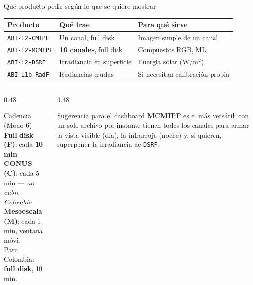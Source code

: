 \documentclass[10pt,aspectratio=169]{beamer}
\begin{document}
\begin{frame}{Qué producto pedir según lo que se quiere mostrar}
  \begin{table}
    \centering\footnotesize
    \begin{tabular}{@{}lll@{}}
      \toprule
      \textbf{Producto} & \textbf{Qué trae} & \textbf{Para qué sirve} \\
      \midrule
      \texttt{ABI-L2-CMIPF} & Un canal, full disk & Imagen simple de un canal \\
      \texttt{ABI-L2-MCMIPF} & \textbf{16 canales}, full disk & Compuestos RGB, ML \\
      \texttt{ABI-L2-DSRF} & Irradiancia en superficie & Energía solar (W/m$^2$) \\
      \texttt{ABI-L1b-RadF} & Radiancias crudas & Si necesitan calibración propia \\
      \bottomrule
    \end{tabular}
  \end{table}

  \vspace{0.3em}
  \begin{columns}[T]
    \begin{column}{0.48\textwidth}
      \begin{block}{Cadencia (Modo 6)}
        \small
        \textbf{Full disk (F)}: cada \textbf{10 min}\\
        \textbf{CONUS (C)}: cada 5 min --- \emph{no cubre Colombia}\\
        \textbf{Mesoescala (M)}: cada 1 min, ventana móvil\\[0.3em]
        Para Colombia: \textbf{full disk}, 10 min.
      \end{block}
    \end{column}
    \begin{column}{0.48\textwidth}
      \begin{block}{Sugerencia para el dashboard}
        \small
        \textbf{MCMIPF} es el más versátil: con un solo archivo por instante
        tienen todos los canales para armar la vista visible (día), la
        infrarroja (noche) y, si quieren, superponer la irradiancia
        de \texttt{DSRF}.
      \end{block}
    \end{column}
  \end{columns}
\end{frame}

\end{document}
